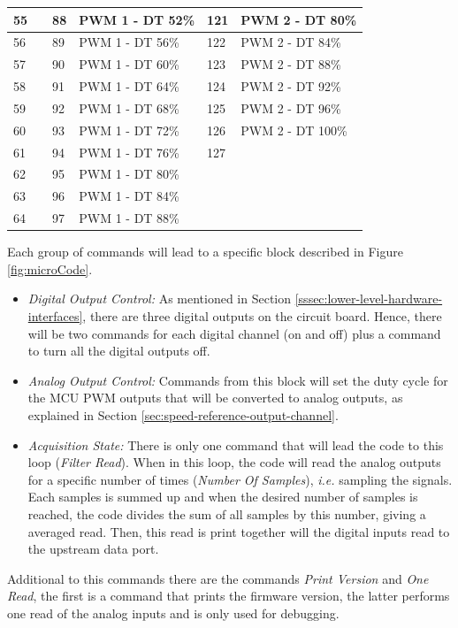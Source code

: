 \begin{table}[h!]
\begin{tabular}{|l|l|l|l|l|l|}
		55 &  & 88 & PWM 1 - DT 52\% & 121 & PWM 2 - DT 80\% \\ \hline
		56 &  & 89 & PWM 1 - DT 56\% & 122 & PWM 2 - DT 84\% \\ \hline
		57 &  & 90 & PWM 1 - DT 60\% & 123 & PWM 2 - DT 88\% \\ \hline
		58 &  & 91 & PWM 1 - DT 64\% & 124 & PWM 2 - DT 92\% \\ \hline
		59 &  & 92 & PWM 1 - DT 68\% & 125 & PWM 2 - DT 96\% \\ \hline
		60 &  & 93 & PWM 1 - DT 72\% & 126 & PWM 2 - DT 100\% \\ \hline
		61 &  & 94 & PWM 1 - DT 76\% & 127 &  \\ \hline
		62 &  & 95 & PWM 1 - DT 80\% &  &  \\ \hline
		63 &  & 96 & PWM 1 - DT 84\% &  &  \\ \hline
		64 &  & 97 & PWM 1 - DT 88\% &  &  \\ \hline
		\end{tabular}
	\end{table}


	Each group of commands will lead to a specific block described in Figure \ref{fig:microCode}.

	\begin{itemize}
		\item \textit{Digital Output Control:} As mentioned in Section \ref{sssec:lower-level-hardware-interfaces}, there are three digital outputs on the circuit board. Hence, there will be two commands for each digital channel (on and off) plus a command to turn all the digital outputs off. 
		\item \textit{Analog Output Control:} Commands from this block will set the duty cycle for the MCU PWM outputs that will be converted to analog outputs, as explained in Section \ref{sec:speed-reference-output-channel}.
		\item \textit{Acquisition State: } There is only one command that will lead the code to this loop (\textit{Filter Read}). When in this loop, the code will read the analog outputs for a specific number of times (\textit{Number Of Samples}), \textit{i.e.} sampling the signals. Each samples is summed up and when the desired number of samples is reached, the code divides the sum of all samples by this number, giving a averaged read. Then, this read is print together will the digital inputs read to the upstream data port.
	\end{itemize}

	Additional to this commands there are the commands \textit{Print Version} and \textit{One Read}, the first is a command that prints the firmware version, the latter performs one read of the analog inputs and is only used for debugging.